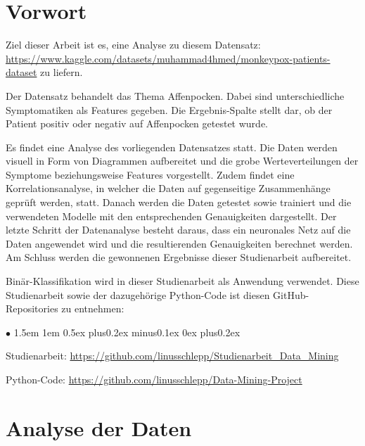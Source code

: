 \documentclass[13pt,a4paper, listof=entryprefix, bibliography=totocnumbered,toc=listofnumbered,lof=listofnumbered]{scrartcl}
\newenvironment{FHitemize}{\begin{list}{$\bullet$} {\leftmargin1.5em \labelsep1em \rightmargin0cm \parsep0.5ex plus0.2ex minus0.1ex \itemsep0ex plus0.2ex}}{\end{list}}
\begin{document}

	\section{Vorwort}
		\label{ch:vorwort}

Ziel dieser Arbeit ist es, eine Analyse zu diesem Datensatz: \linebreak \url{https://www.kaggle.com/datasets/muhammad4hmed/monkeypox-patients-dataset}  
zu liefern. 

Der Datensatz behandelt das Thema Affenpocken. Dabei sind unterschiedliche Symptomatiken als Features gegeben. Die Ergebnis-Spalte stellt dar, ob 
der Patient positiv oder negativ auf Affenpocken getestet wurde.

Es findet eine Analyse des vorliegenden Datensatzes statt.  Die Daten werden visuell in Form von Diagrammen aufbereitet und die grobe Werteverteilungen
der Symptome beziehungsweise Features vorgestellt. Zudem findet eine Korrelationsanalyse, in welcher die 
Daten auf gegenseitige Zusammenhänge geprüft werden, statt. Danach werden die Daten getestet sowie trainiert und die
verwendeten Modelle mit den entsprechenden Genauigkeiten dargestellt. Der letzte Schritt der Datenanalyse
besteht daraus, dass ein neuronales Netz auf die Daten angewendet wird und die resultierenden Genauigkeiten
berechnet werden. Am Schluss werden die gewonnenen Ergebnisse dieser Studienarbeit aufbereitet. 

Binär-Klassifikation wird in dieser Studienarbeit als Anwendung verwendet. Diese Studienarbeit sowie der dazugehörige Python-Code ist diesen
GitHub-Repositories zu entnehmen: 

	\begin{FHitemize}
		\item Studienarbeit: \url{https://github.com/linusschlepp/Studienarbeit_Data_Mining}
		\item Python-Code: \url{https://github.com/linusschlepp/Data-Mining-Project}
	\end{FHitemize}
	

	\section{Analyse der Daten}
		\label{ch:analyse_daten}
\end{document}

